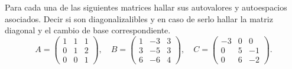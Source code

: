 \item Para cada una de las siguientes matrices hallar sus autovalores y autoespacios asociados. Decir si son diagonalizalibles y en caso de serlo hallar la matriz diagonal y el cambio de base correspondiente.
    \[A=\begin{pmatrix}
        1&1&1\\0&1&2\\0&0&1
    \end{pmatrix},\quad B=\begin{pmatrix}
        1&-3&3\\3&-5&3\\6&-6&4
    \end{pmatrix},\quad C=\begin{pmatrix}
        -3&0&0\\0&5&-1\\0&6&-2
    \end{pmatrix}.\]
    \begin{mdframed}[style=s]
        
    \end{mdframed}